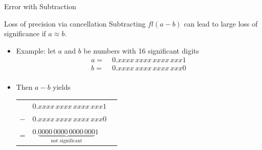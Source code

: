 \documentclass[10pt]{beamer}
\begin{document}
\begin{frame}{Error with Subtraction}
\begin{block}{Loss of precision via cancellation}
Subtracting $fl(a-b)$ can lead to large loss of significance if $a \approx b$.
\end{block}
\begin{itemize}
    \item  Example: let $a$ and $b$ be numbers with 16 significant digits 
\begin{align*}
  a=\; & 0.xxxx\,xxxx\,xxxx\,xxx1\\
  b=\; & 0.xxxx\,xxxx\,xxxx\,xxx0\\
\end{align*}
\item  Then $a-b$ yields \qquad
\begin{tabular}{c l l}
& $0.xxxx\,xxxx\,xxxx\,xxx1$& \\
$-$& $0.xxxx\,xxxx\,xxxx\,xxx0$\\\hline
=& $0.\underbrace{0000\,0000\,0000\,000}_{\text{not significant}}1$ & \\
\end{tabular}
\end{itemize}


\end{frame}




\end{document}
